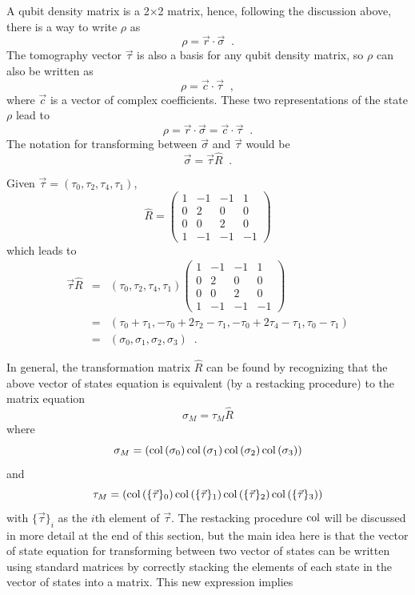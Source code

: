 A qubit density matrix is a 2$\times$2 matrix, hence, following the discussion above, there is a way to write $\rho$ as
$$
\rho = \vec{r}\cdot\vec{\sigma}\;\;.
$$
The tomography vector $\vec{\tau}$ is also a basis for any qubit density matrix, so $\rho$ can also be written as
$$
\rho = \vec{c}\cdot\vec{\tau}\;\;,
$$
where $\vec{c}$ is a vector of complex coefficients.  These two representations of the state $\rho$ lead to
$$
\rho = \vec{r}\cdot\vec{\sigma} = \vec{c}\cdot\vec{\tau}\;\;.
$$
The notation for transforming between $\vec{\sigma}$ and $\vec{\tau}$ would be
$$
\vec{\sigma} = \vec{\tau}\hat{R}\;\;.
$$
\begin{example}
Given $\vec{\tau} = (\tau_0,\tau_2,\tau_4,\tau_1)$,
$$
\hat{R} = \begin{pmatrix}
1 & -1 & -1 & 1\\
0 & 2 & 0 & 0\\
0 & 0 & 2 & 0\\
1 & -1 & -1 & -1
\end{pmatrix}
$$
which leads to
\begin{eqnarray*}
\vec{\tau}\hat{R} &=& (\tau_0,\tau_2,\tau_4,\tau_1)\begin{pmatrix}
1 & -1 & -1 & 1\\
0 & 2 & 0 & 0\\
0 & 0 & 2 & 0\\
1 & -1 & -1 & -1
\end{pmatrix}\\
&=& (\tau_0+\tau_1,-\tau_0+2\tau_2-\tau_1,-\tau_0+2\tau_4-\tau_1,\tau_0-\tau_1)\\
&=& (\sigma_0,\sigma_1,\sigma_2,\sigma_3)\;\;.
\end{eqnarray*}
\end{example}
In general, the transformation matrix $\hat{R}$ can be found by recognizing that the above vector of states equation is equivalent (by a restacking procedure) to the matrix equation
$$
\sigma_M = \tau_M\hat{R}
$$
where 
$$
\sigma_M = \left( \operatorname{col}\left(\sigma_0\right) \operatorname{col}\left(\sigma_1\right) \operatorname{col}\left(\sigma_2\right) \operatorname{col}\left(\sigma_3\right)\right)
$$
and
$$
\tau_M = \left( \operatorname{col}\left(\{\vec{\tau}\}_0\right) \operatorname{col}\left(\{\vec{\tau}\}_1\right) \operatorname{col}\left(\{\vec{\tau}\}_2\right) \operatorname{col}\left(\{\vec{\tau}\}_3\right)\right)
$$
with $\{\vec{\tau}\}_i$ as the $i$th element of $\vec{\tau}$.  The restacking procedure $\operatorname{col}$ will be discussed in more detail at the end of this section, but the main idea here is that the vector of state equation for transforming between two vector of states can be written using standard matrices by correctly stacking the elements of each state in the vector of states into a matrix.  This new expression implies
